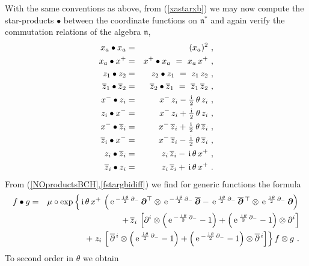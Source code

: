 \documentclass[11pt,a4paper]{article}
\newcommand{\1}{\mathbb{1}}
\newcommand{\mbf}[1]{{\boldsymbol {#1} }}
\def\ii{{\,{\rm i}\,}}
\def\mdell{{\mbf\partial}}
\def\mfn{{\mathfrak n}}
\def\e{{\,\rm e}\,}
\def\bea{\begin{eqnarray}}
\def\eea{\end{eqnarray}}
\newcommand{\z}{\zeta}
\begin{document}
With the same conventions as above, from (\ref{xastarxb}) we may now
compute the star-products $\bullet$ between the coordinate functions
on $\mfn^*$ and again verify the commutation relations of the
algebra $\mfn$,
\bea
x_a\bullet x_a&=&(x_a)^2 \ , \nonumber\\
x_a\bullet x^+&=&x^+\bullet x_a~=~x_a\,x^+ \ ,
\nonumber\\z_1\bullet z_2&=&z_2\bullet z_1
~=~z_1\,z_2 \ ,\nonumber\\\overline{z}_1\bullet \overline{z}_2
&=&\overline{z}_2\bullet \overline{z}_1
~=~\overline{z}_1\,\overline{z}_2 \ , \nonumber\\
x^-\bullet z_i&=&x^-\,z_i-\mbox{$\frac\ii2$}\,
\theta\,z_i \ , \nonumber\\
z_i\bullet x^-&=&x^-\,z_i+\mbox{$\frac\ii2$}\,
\theta\,z_i \ , \nonumber\\x^-\bullet \overline{z}_i
&=&x^-\,\overline{z}_i+\mbox{$\frac\ii2$}\,
\theta\,\overline{z}_i \ , \nonumber\\\overline{z}_i\bullet x^-
&=&x^-\,\overline{z}_i-\mbox{$\frac\ii2$}\,
\theta\,\overline{z}_i \ , \nonumber\\
z_i\bullet \overline{z}_i&=&z_i\,\overline{z}_i-\ii\theta\,x^+ \ ,
\nonumber\\ \overline{z}_i\bullet z_i &=&z_i\,\overline{z}_i+
\ii\theta\,x^+  \ .
\label{TOsymcoordstarprods}\eea
From (\ref{NOproductsBCH},\ref{fstargbidiff}) we find for generic
functions the formula
\bea
f\bullet g&=&\mu\circ\exp\left\{\ii\theta\,x^+\,\left(\e^{-\frac{\ii\theta}2
\,\partial_-}\,
\mdell^\top\otimes\e^{-\frac{\ii\theta}2\,\partial_-}\,
\overline{\mdell}-\e^{\frac{\ii\theta}2\,\partial_-}\,
\overline{\mdell}{}^{\,\top}\otimes\e^{\frac{\ii\theta}2\,\partial_-}\,
\mdell\right)\right.\nonumber
\\ &&\qquad\qquad+\,\overline{z}_i\,\left[\partial^i\otimes
\left(\e^{-\frac{\ii\theta}2\,\partial_-}-1\right)
+\left(\e^{\frac{\ii\theta}2\,\partial_-}-1\right)\otimes
\partial^i\right]\nonumber\\ &&\qquad\qquad+\left.
z_i\,\left[\,\overline{\partial}{}^{\,i}\otimes
\left(\e^{\frac{\ii\theta}2\,\partial_-}-1\right)
+\left(\e^{-\frac{\ii\theta}2\,\partial_-}-1\right)
\otimes\overline{\partial}{}^{\,i}\right]\right\}f\otimes g \ .
\label{TOsymstargen}\eea
To second order in $\theta$ we obtain
\end{document}
